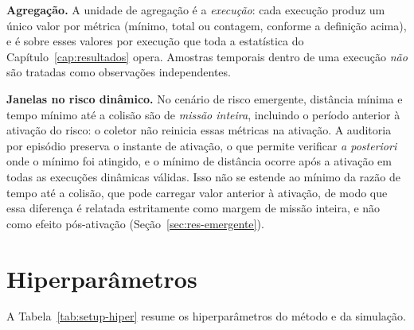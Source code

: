 \textbf{Agregação.} A unidade de agregação é a \emph{execução}: cada execução produz um
único valor por métrica (mínimo, total ou contagem, conforme a definição acima), e é
sobre esses valores por execução que toda a estatística do
Capítulo~\ref{cap:resultados} opera. Amostras temporais dentro de uma execução
\emph{não} são tratadas como observações independentes.

\textbf{Janelas no risco dinâmico.} No cenário de risco emergente, distância mínima e
tempo mínimo até a colisão são de \emph{missão inteira}, incluindo o período anterior à
ativação do risco: o coletor não reinicia essas métricas na ativação. A auditoria por
episódio preserva o instante de ativação, o que permite verificar \emph{a posteriori}
onde o mínimo foi atingido, e o mínimo de distância ocorre após a ativação em todas
as execuções dinâmicas válidas. Isso não se estende ao mínimo da razão de tempo até a
colisão, que pode carregar valor anterior à ativação, de modo que essa diferença é
relatada estritamente como margem de missão inteira, e não como efeito pós-ativação
(Seção~\ref{sec:res-emergente}).

\section{Hiperparâmetros}
\label{sec:setup-hiper}

A Tabela~\ref{tab:setup-hiper} resume os hiperparâmetros do método e da simulação.

